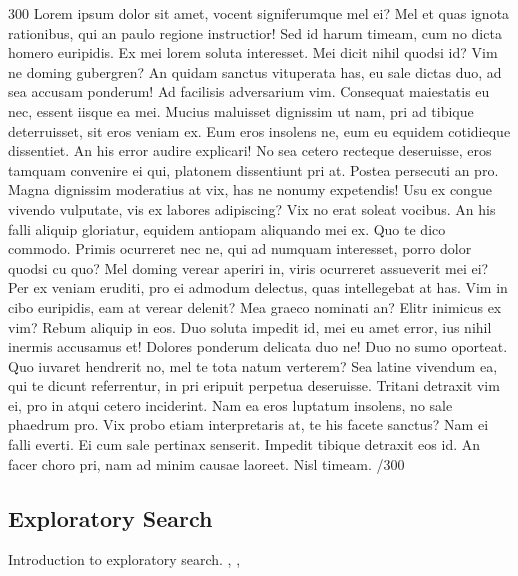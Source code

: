 \documentclass{sigchi}
\begin{document}
300 Lorem ipsum dolor sit amet, vocent signiferumque mel ei? Mel et quas ignota rationibus, qui an paulo regione instructior! Sed id harum timeam, cum no dicta homero euripidis. Ex mei lorem soluta interesset. Mei dicit nihil quodsi id? Vim ne doming gubergren? An quidam sanctus vituperata has, eu sale dictas duo, ad sea accusam ponderum! Ad facilisis adversarium vim. Consequat maiestatis eu nec, essent iisque ea mei. Mucius maluisset dignissim ut nam, pri ad tibique deterruisset, sit eros veniam ex. Eum eros insolens ne, eum eu equidem cotidieque dissentiet. An his error audire explicari! No sea cetero recteque deseruisse, eros tamquam convenire ei qui, platonem dissentiunt pri at. Postea persecuti an pro. Magna dignissim moderatius at vix, has ne nonumy expetendis! Usu ex congue vivendo vulputate, vis ex labores adipiscing? Vix no erat soleat vocibus. An his falli aliquip gloriatur, equidem antiopam aliquando mei ex. Quo te dico commodo. Primis ocurreret nec ne, qui ad numquam interesset, porro dolor quodsi cu quo? Mel doming verear aperiri in, viris ocurreret assueverit mei ei? Per ex veniam eruditi, pro ei admodum delectus, quas intellegebat at has. Vim in cibo euripidis, eam at verear delenit? Mea graeco nominati an? Elitr inimicus ex vim? Rebum aliquip in eos. Duo soluta impedit id, mei eu amet error, ius nihil inermis accusamus et! Dolores ponderum delicata duo ne! Duo no sumo oporteat. Quo iuvaret hendrerit no, mel te tota natum verterem? Sea latine vivendum ea, qui te dicunt referrentur, in pri eripuit perpetua deseruisse. Tritani detraxit vim ei, pro in atqui cetero inciderint. Nam ea eros luptatum insolens, no sale phaedrum pro. Vix probo etiam interpretaris at, te his facete sanctus? Nam ei falli everti. Ei cum sale pertinax senserit. Impedit tibique detraxit eos id. An facer choro pri, nam ad minim causae laoreet. Nisl timeam. /300

\subsection{Exploratory Search}
Introduction to exploratory search.
\cite{march06}, \cite{white09}, \cite{tvaro11}
\end{document}
